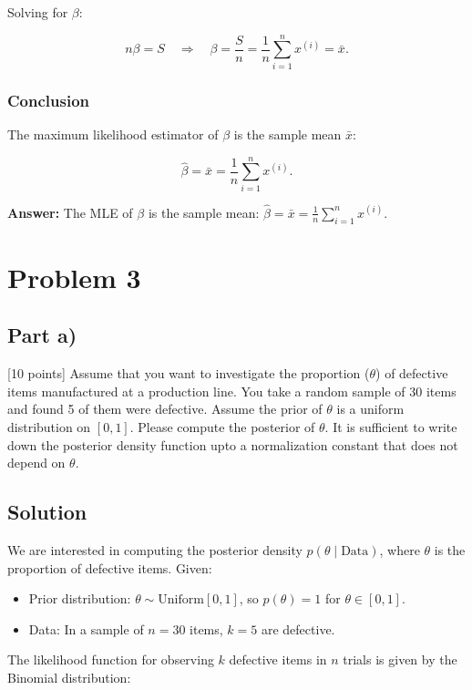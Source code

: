 \documentclass{article}
\begin{document}
Solving for $\beta$:

\[
n\beta = S \quad \Rightarrow \quad \beta = \frac{S}{n} = \frac{1}{n} \sum_{i=1}^{n} x^{(i)} = \bar{x}.
\]

\subsubsection*{Conclusion}

The maximum likelihood estimator of $\beta$ is the sample mean $\bar{x}$:

\[
\hat{\beta} = \bar{x} = \frac{1}{n} \sum_{i=1}^{n} x^{(i)}.
\]

\textbf{Answer:} The MLE of $\beta$ is the sample mean: $\displaystyle \hat{\beta} = \bar{x} = \frac{1}{n} \sum_{i=1}^{n} x^{(i)}$.

\section*{Problem 3}

\subsection*{Part a)}

[10 points] Assume that you want to investigate the proportion ($\theta$) of defective items manufactured at a production line. You take a random sample of 30 items and found 5 of them were defective. Assume the prior of $\theta$ is a uniform distribution on $[0, 1]$. Please compute the posterior of $\theta$. It is sufficient to write down the posterior density function upto a normalization constant that does not depend on $\theta$.

\subsection*{Solution}

We are interested in computing the posterior density $p(\theta \mid \text{Data})$, where $\theta$ is the proportion of defective items. Given:

\begin{itemize}
    \item Prior distribution: $\theta \sim \text{Uniform}[0,1]$, so $p(\theta) = 1$ for $\theta \in [0,1]$.
    \item Data: In a sample of $n = 30$ items, $k = 5$ are defective.
\end{itemize}

The likelihood function for observing $k$ defective items in $n$ trials is given by the Binomial distribution:
\end{document}
